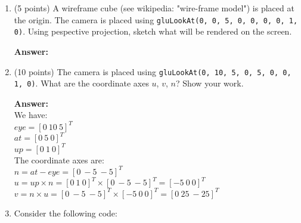 \documentclass[13pt]{letter}
\begin{document}
\begin{enumerate}
$$  \right] $$
  $$ M = \left[
  \begin{array}{ccc}
     \cos{90} &  \sin{90} & x \\
    -\sin{90} &  \cos{90} & 0 \\
            0 &         0 & 1
  \end{array}
  \right]
  \left[
  \begin{array}{ccc}
    1 &  0 & -x \\
    0 &  1 & -y \\
    0 &  0 &  1
  \end{array}
  \right]
  $$
  $$ M = \left[
  \begin{array}{ccc}
     \cos{90} &  \sin{90} & -x\cos{90} - y\sin{90} + x \\
    -\sin{90} &  \cos{90} &  x\sin{90} - y\cos{90} \\
            0 &         0 & 1
  \end{array}
  \right] $$
	\vspace{13pt}
	
	\item (5 points)
	A wireframe cube (see wikipedia: "wire-frame model") is placed at the origin. The camera is placed using \texttt{gluLookAt(0, 0, 5, 0, 0, 0, 0, 1, 0)}. Using pespective projection, sketch what will be rendered on the screen.
	
	\textbf{Answer:} \\
	

	\vspace{144pt}

	\item (10 points)
	The camera is placed using \texttt{gluLookAt(0, 10, 5, 0, 5, 0, 0, 1, 0)}. What are the coordinate axes $u$, $v$, $n$? Show your work.

  \textbf{Answer:} \\
  We have: \\
  $eye = [0~10~5]^T$ \\
  $at = [0~5~0]^T$ \\
  $up = [0~1~0]^T$ \\
  The coordinate axes are: \\
  $n = at - eye = [0~-5~-5]^T$ \\
  $u = up \times n = [0~1~0]^T \times [0~-5~-5]^T = [-5~0~0]^T$ \\
  $v = n \times u = [0~-5~-5]^T \times [-5~0~0]^T = [0~25~-25]^T$ 

	\vspace{13pt}

	\item 
	Consider the following code:
	

\end{enumerate}
\end{document}

